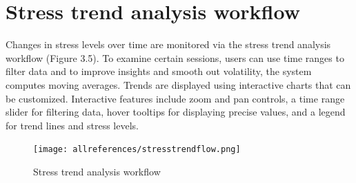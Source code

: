 \documentclass[Arial,12pt,openright,twoside]{book}
\begin{document}
\FloatBarrier
\vspace{10pt} %

\section{Stress trend analysis workflow}
Changes in stress levels over time are monitored via the stress trend analysis workflow (Figure 3.5). To examine certain sessions, users can use time ranges to filter data and to improve insights and smooth out volatility, the system computes moving averages. Trends are displayed using interactive charts that can be customized. Interactive features include zoom and pan controls, a time range slider for filtering data, hover tooltips for displaying precise values, and a legend for trend lines and stress levels. 
\vspace{10pt} %
\begin{figure}[H]
    \centering
    \texttt{[image: allreferences/stresstrendflow.png]}
    \caption{Stress trend analysis workflow}
    \label{fig:system_architecture}
\end{figure}
\vspace{10pt} %
\end{document}
